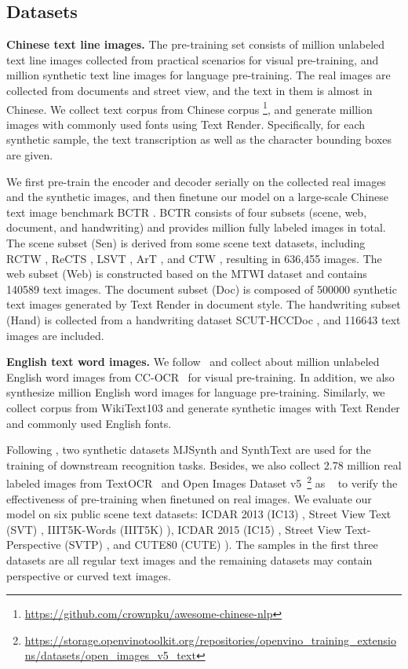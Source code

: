 \subsection{Datasets}
\noindent\textbf{Chinese text line images.} 
The pre-training set consists of  million unlabeled text line images collected from practical scenarios for visual pre-training, and  million synthetic  text line images for language pre-training. The real images are collected from documents and street view, and the text in them is almost in Chinese. We collect text corpus from Chinese corpus \footnote{\url{https://github.com/crownpku/awesome-chinese-nlp}}, and generate  million images with  commonly used fonts using Text Render. Specifically, for each synthetic sample, the text transcription as well as the character bounding boxes are given.

We first pre-train the encoder and decoder serially on the collected real images and the synthetic images, and then finetune our model on a large-scale Chinese text image benchmark BCTR \cite{chenBCTR}. BCTR consists of four subsets (scene, web, document, and handwriting) and provides  million fully labeled images in total. The scene subset (Sen) is derived from some scene text datasets, including RCTW \cite{RCTW}, ReCTS \cite{rects}, LSVT \cite{lsvt}, ArT \cite{art}, and CTW \cite{CTW}, resulting in 636,455 images. The web subset (Web) is constructed based on the MTWI \cite{MTWI} dataset and contains 140589 text images. The document subset (Doc) is composed of 500000 synthetic text images generated by Text Render in document style. The handwriting subset (Hand) is collected from a handwriting dataset SCUT-HCCDoc \cite{scuthccdoc}, and 116643 text images are included. 

\vspace{2mm}
\noindent\textbf{English text word images.} 
We follow~\cite{dig} and  collect about  million unlabeled English word images from CC-OCR~\cite{tap} for visual pre-training. In addition, we also synthesize  million English word images for language pre-training. Similarly, we collect corpus from WikiText103 \cite{merity2016pointer} and generate synthetic images with Text Render and  commonly used English fonts. 

Following \cite{shi2018aster,yu2020towards,ShanchengFang2021ReadLH,YuxinWang2021FromTT,XinyunZhang2022ContextbasedCL}, two synthetic datasets MJSynth \cite{mj} and SynthText \cite{st} are used for the training of downstream recognition tasks. Besides, we also collect 2.78 million real labeled images from TextOCR~\cite{TextOCR} and Open Images Dataset v5~\footnote{\url{https://storage.openvinotoolkit.org/repositories/openvino_training_extensions/datasets/open_images_v5_text}} as ~\cite{dig} to verify the effectiveness of pre-training when finetuned on real images.  We evaluate our model on six public scene text datasets: ICDAR 2013 (IC13) \cite{ic13}, Street View Text (SVT) \cite{wang2011end},  IIIT5K-Words (IIIT5K) \cite{iiit5k}), ICDAR 2015 (IC15) \cite{ic15}, Street View Text-Perspective (SVTP) \cite{svtp}, and CUTE80 (CUTE) \cite{cute}). The samples in the first three datasets are all regular text images and the remaining datasets may contain perspective or curved text images. 


